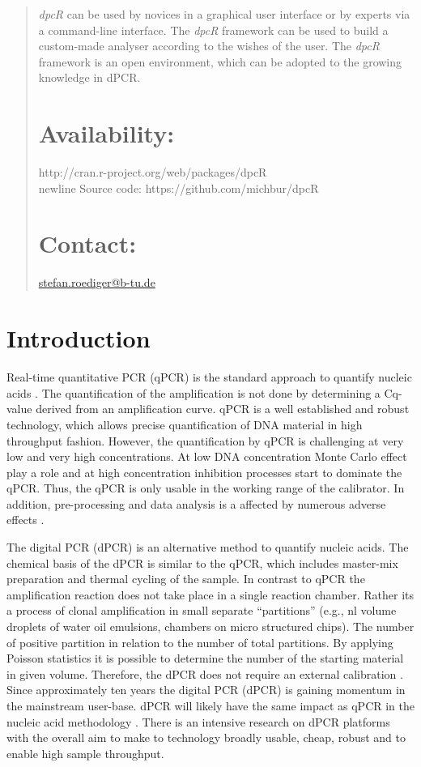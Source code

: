 \documentclass{bioinfo}
\begin{document}
\begin{abstract}
\textit{dpcR} can be used by novices in a graphical user interface or by experts 
via a command-line interface. The \textit{dpcR} framework can be used to build a 
custom-made analyser according to the wishes of the user. The \textit{dpcR} 
framework is an open environment, which can be adopted to the growing knowledge in 
dPCR. 

\section{Availability:}
http://cran.r-project.org/web/packages/dpcR\\newline
Source code: https://github.com/michbur/dpcR\

\section{Contact:} \href{stefan.roediger@b-tu.de}{stefan.roediger@b-tu.de}
\end{abstract}

\section{Introduction}

Real-time quantitative PCR (qPCR) is the standard approach to quantify nucleic 
acids \cite{pabinger_survey_2014}. The quantification of the amplification is 
not done by determining a Cq-value derived from an amplification curve. qPCR is 
a well established and robust technology, which allows precise quantification of 
DNA material in high throughput fashion. However, the quantification by qPCR is 
challenging at very low and very high concentrations. At low DNA concentration 
Monte Carlo effect play a role and at high concentration inhibition processes 
start to dominate the qPCR. Thus, the qPCR is only usable in the working range 
of the calibrator. In addition, pre-processing and data analysis is a affected 
by numerous adverse effects \cite{ruijter_2013, spiess_impact_2015}.

The digital PCR (dPCR) is an alternative method to quantify nucleic acids. The 
chemical basis of the dPCR is similar to the qPCR, which includes master-mix 
preparation and thermal cycling of the sample. In contrast to qPCR the 
amplification reaction does not take place in a single reaction chamber. Rather 
its a process of clonal amplification in small separate ``partitions'' (e.g., nl 
volume droplets of water oil emulsions, chambers on micro structured chips). The 
number of positive partition in relation to the number of total partitions. By 
applying Poisson statistics it is possible to determine the number of the 
starting material in given volume. Therefore, the dPCR does not require an 
external calibration \cite{selck_increased_2013, rodiger_r_2015}. Since 
approximately ten years the digital PCR (dPCR) is gaining momentum in the 
mainstream user-base. dPCR will likely have the same impact as qPCR in the 
nucleic acid methodology \cite{huggett_qpcr_2015, morley_digital_2014, 
rodiger_r_2015}. There is an intensive research on dPCR platforms with the 
overall aim to make to technology broadly usable, cheap, robust and to enable 
high sample throughput. 
\end{document}
